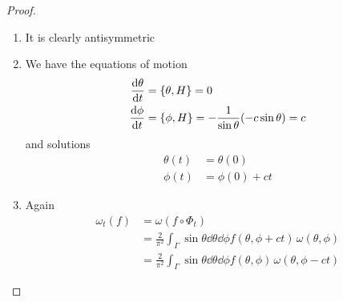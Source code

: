 \begin{proof}
	\begin{enumerate}
		\item It is clearly antisymmetric
		\item We have the equations of motion
		\begin{align*}
			\dv{\theta}{t} &= \{\theta, H\} = 0\\
			\dv{\phi}{t} &= \{\phi, H\} = -\frac{1}{\sin\theta} (-c\sin\theta) = c
		\end{align*}
	and solutions
	\begin{align*}
		\theta(t) &= \theta(0)\\
		\phi(t) &= \phi(0) + ct
	\end{align*}
\item Again
\begin{align*}
	\omega_t(f) &= \omega(f\circ \Phi_t)\\
	&= \frac2{\pi^2} \int_\Gamma \sin\theta \dd{\theta}\dd{\phi} f(\theta, \phi+ct) \, \omega(\theta, \phi)\\
	&=\frac2{\pi^2} \int_\Gamma \sin\theta \dd{\theta}\dd{\phi} f(\theta, \phi) \, \omega(\theta, \phi-ct)
\end{align*}
	\end{enumerate}
\end{proof}
